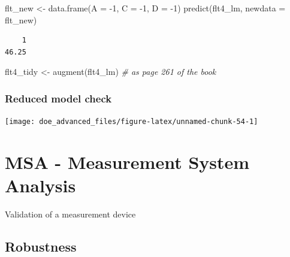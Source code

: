 \documentclass[
]{book}
\newenvironment{Shaded}{\begin{snugshade}}{\end{snugshade}}
\newcommand{\AttributeTok}[1]{\textcolor[rgb]{0.77,0.63,0.00}{#1}}
\newcommand{\CommentTok}[1]{\textcolor[rgb]{0.56,0.35,0.01}{\textit{#1}}}
\newcommand{\ConstantTok}[1]{\textcolor[rgb]{0.00,0.00,0.00}{#1}}
\newcommand{\DecValTok}[1]{\textcolor[rgb]{0.00,0.00,0.81}{#1}}
\newcommand{\FunctionTok}[1]{\textcolor[rgb]{0.00,0.00,0.00}{#1}}
\newcommand{\NormalTok}[1]{#1}
\newcommand{\OtherTok}[1]{\textcolor[rgb]{0.56,0.35,0.01}{#1}}
\newcommand{\SpecialCharTok}[1]{\textcolor[rgb]{0.00,0.00,0.00}{#1}}
\begin{document}
\begin{Shaded}
\begin{Highlighting}[]
\NormalTok{flt\_new }\OtherTok{\textless{}{-}} \FunctionTok{data.frame}\NormalTok{(}\AttributeTok{A =} \SpecialCharTok{{-}}\DecValTok{1}\NormalTok{, }\AttributeTok{C =} \SpecialCharTok{{-}}\DecValTok{1}\NormalTok{, }\AttributeTok{D =} \SpecialCharTok{{-}}\DecValTok{1}\NormalTok{)}
\FunctionTok{predict}\NormalTok{(flt4\_lm, }\AttributeTok{newdata =}\NormalTok{ flt\_new)}
\end{Highlighting}
\end{Shaded}

\begin{verbatim}
    1 
46.25 
\end{verbatim}

\begin{Shaded}
\begin{Highlighting}[]
\NormalTok{flt4\_tidy }\OtherTok{\textless{}{-}} \FunctionTok{augment}\NormalTok{(flt4\_lm) }\CommentTok{\# as page 261 of the book}
\end{Highlighting}
\end{Shaded}

\hypertarget{reduced-model-check}{%
\subsection{Reduced model check}\label{reduced-model-check}}

\begin{Shaded}
\end{Shaded}

\texttt{[image: doe\_advanced\_files/figure-latex/unnamed-chunk-54-1]}

\hypertarget{MSA}{%
\chapter{MSA - Measurement System Analysis}\label{MSA}}

Validation of a measurement device

\hypertarget{robustness}{%
\section{Robustness}\label{robustness}}
\end{document}
